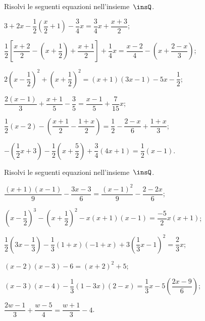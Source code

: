 \begin{esercizio}[\Ast]
\label{ese:13.39}
Risolvi le seguenti equazioni nell'insieme~$\insQ$.
\begin{enumeratea}
\spazielenx
 \item $3+2x-\dfrac{1}{2}\left(\dfrac{x}{2}+1\right)-\dfrac{3}{4}x=\dfrac{3}{4}x+\dfrac{x+3}{2}$;
 \item $\dfrac{1}{2}\left[\dfrac{x+2}{2}-\left(x+\dfrac{1}{2}\right)+\dfrac{x+1}{2}\right]+\dfrac{1}{4}x=\dfrac{x-2}{4}-\left(x+\dfrac{2-x}{3}\right)$;
 \item $2\left(x-\dfrac{1}{2}\right)^{2}+\left(x+\dfrac{1}{2}\right)^{2}=(x+1)(3x-1)-5x-\dfrac{1}{2}$;
 \item $\dfrac{2\left(x-1\right)}{3}+\dfrac{x+1}{5}-\dfrac{3}{5}=\dfrac{x-1}{5}+\dfrac{7}{15}x$;
 \item $\dfrac{1}{2}(x-2)-\left(\dfrac{x+1}{2}-\dfrac{1+x}{2}\right)=\dfrac{1}{2}-\dfrac{2-x}{6}+\dfrac{1+x}{3}$;
 \item $-\left(\dfrac{1}{2}x+3\right)-\dfrac{1}{2}\left(x+\dfrac{5}{2}\right)+\dfrac{3}{4}(4x+1)=\dfrac{1}{2}(x-1)$.
\end{enumeratea}
\end{esercizio}

\begin{esercizio}[\Ast]
\label{ese:13.40}
Risolvi le seguenti equazioni nell'insieme~$\insQ$.
\begin{enumeratea}
\spazielenx
 \item $\dfrac{(x+1)(x-1)}{9}-\dfrac{3x-3}{6}=\dfrac{(x-1)^{2}}{9}-\dfrac{2-2x}{6}$;
 \item $\left(x-\dfrac{1}{2}\right)^{3}-\left(x+\dfrac{1}{2}\right)^{2}-x(x+1)(x-1)=\dfrac{-5}{2}x(x+1)$;
 \item $\dfrac{1}{2}\left(3x-\dfrac{1}{3}\right)-\dfrac{1}{3}(1+x)(-1+x)+3\left(\dfrac{1}{3}x-1\right)^{2}=\dfrac{2}{3}x$;
 \item $(x-2)(x-3)-6=(x+2)^2 +5$;
 \item $(x-3)(x-4)-\dfrac{1}{3}(1-3x)(2-x)=\dfrac{1}{3}x-5\left(\dfrac{2x-9}{6}\right)$;
 \item $\dfrac{2w-1}{3}+\dfrac{w-5}{4}=\dfrac{w+1}{3}-4$.
\end{enumeratea}
\end{esercizio}

